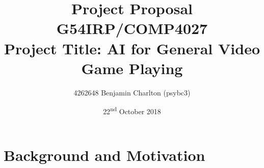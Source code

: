 \documentclass[a4paper]{article}
\begin{document}
\title{
    \vspace{-4ex}
    \LARGE{Project Proposal}
    \\ \large{G54IRP/COMP4027}
    \\ \large{Project Title: AI for General Video Game Playing}\vspace{-3ex}}
\author{4262648 Benjamin Charlton (psybc3)}
\date{\vspace{-2ex}22\textsuperscript{nd} October 2018}
\maketitle
\vspace{-7ex}

\section{Background and Motivation}
\end{document}
